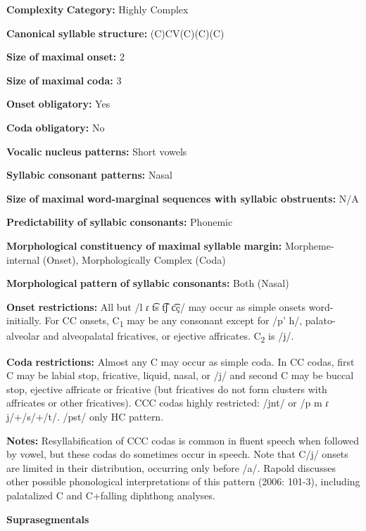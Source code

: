 \textbf{Complexity} \textbf{Category:} Highly Complex

\textbf{Canonical} \textbf{syllable} \textbf{structure:} (C)CV(C)(C)(C) \citep[91-112]{Rapold2006}

\textbf{Size} \textbf{of} \textbf{maximal} \textbf{onset:} 2

\textbf{Size} \textbf{of} \textbf{maximal} \textbf{coda:} 3

\textbf{Onset} \textbf{obligatory:} Yes

\textbf{Coda} \textbf{obligatory:} No

\textbf{Vocalic} \textbf{nucleus} \textbf{patterns:} Short vowels

\textbf{Syllabic} \textbf{consonant} \textbf{patterns:} Nasal

\textbf{Size} \textbf{of} \textbf{maximal} \textbf{word{}-marginal sequences with syllabic obstruents:} N/A

\textbf{Predictability} \textbf{of} \textbf{syllabic} \textbf{consonants:} Phonemic

\textbf{Morphological} \textbf{constituency} \textbf{of} \textbf{maximal} \textbf{syllable} \textbf{margin:} Morpheme-internal (Onset), Morphologically Complex (Coda)

\textbf{Morphological} \textbf{pattern} \textbf{of} \textbf{syllabic} \textbf{consonants:} Both (Nasal)

\textbf{Onset} \textbf{restrictions:} All but /l ɾ t͡s t͡ʃ c͡ç/ may occur as simple onsets word-initially. For CC onsets, C\textsubscript{1} may be any consonant except for /p’ h/, palato-alveolar and alveopalatal fricatives, or ejective affricates. C\textsubscript{2} is /j/.

\textbf{Coda} \textbf{restrictions:} Almost any C may occur as simple coda. In CC codas, first C may be labial stop, fricative, liquid, nasal, or /j/ and second C may be buccal stop, ejective affricate or fricative (but fricatives do not form clusters with affricates or other fricatives). CCC codas highly restricted: /jnt/ or /p m ɾ j/+/s/+/t/. /pst/ only HC pattern.

\textbf{Notes:} Resyllabification of CCC codas is common in fluent speech when followed by vowel, but these codas do sometimes occur in speech. Note that C/j/ onsets are limited in their distribution, occurring only before /a/. Rapold discusses other possible phonological interpretations of this pattern (2006: 101-3), including palatalized C and C+falling diphthong analyses.

\textbf{Suprasegmentals}

